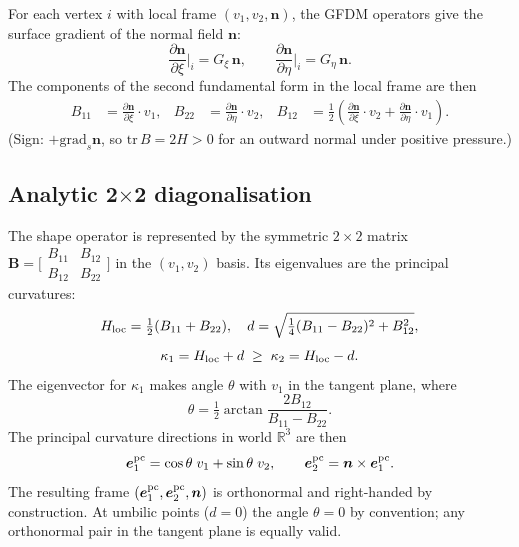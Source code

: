 \documentclass[11pt]{article}
\newcommand{\vv}[1]{\bm{#1}}          %
\newcommand{\nn}{\vv{n}}               %
\newcommand{\kone}{\kappa_1}
\newcommand{\ktwo}{\kappa_2}
\newcommand{\R}{\mathbb{R}}
\begin{document}
For each vertex $i$ with local frame $(v_1,v_2,\nn)$, the GFDM operators give
the surface gradient of the normal field $\nn$:
\begin{equation}
  \frac{\partial\nn}{\partial\xi}\Big|_i = G_\xi\,\nn, \qquad
  \frac{\partial\nn}{\partial\eta}\Big|_i = G_\eta\,\nn.
  \label{eq:grad-n}
\end{equation}
The components of the second fundamental form in the local frame are then
\begin{align}
  B_{11} &= \frac{\partial\nn}{\partial\xi}\cdot v_1, &
  B_{22} &= \frac{\partial\nn}{\partial\eta}\cdot v_2, &
  B_{12} &= \tfrac12\!\left(\frac{\partial\nn}{\partial\xi}\cdot v_2
                           + \frac{\partial\nn}{\partial\eta}\cdot v_1\right).
  \label{eq:B-components}
\end{align}
(Sign: $+\mathrm{grad}_s\nn$, so $\mathrm{tr}\,B=2H>0$ for an outward normal
under positive pressure.)

\subsection{Analytic 2$\times$2 diagonalisation}

The shape operator is represented by the symmetric $2\times 2$ matrix
$\mathbf{B}=\bigl[\begin{smallmatrix}B_{11}&B_{12}\\B_{12}&B_{22}\end{smallmatrix}\bigr]$
in the $(v_1,v_2)$ basis.  Its eigenvalues are the principal curvatures:
\begin{equation}
  H_{\rm loc} = \tfrac12(B_{11}+B_{22}), \quad
  d = \sqrt{\tfrac14(B_{11}-B_{22})^2 + B_{12}^2},
  \label{eq:eig-Hloc}
\end{equation}
\begin{equation}
  \kone = H_{\rm loc}+d \;\ge\; \ktwo = H_{\rm loc}-d.
  \label{eq:eig-kappas}
\end{equation}
The eigenvector for $\kone$ makes angle $\theta$ with $v_1$ in the tangent
plane, where
\begin{equation}
  \theta = \tfrac12\arctan\!\frac{2B_{12}}{B_{11}-B_{22}}.
  \label{eq:theta}
\end{equation}
The principal curvature directions in world $\R^3$ are then
\begin{equation}
  \vv{e}_1^{\rm pc} = \cos\theta\;v_1 + \sin\theta\;v_2, \qquad
  \vv{e}_2^{\rm pc} = \nn\times\vv{e}_1^{\rm pc}.
  \label{eq:pc-dirs}
\end{equation}
The resulting frame $(\vv{e}_1^{\rm pc},\vv{e}_2^{\rm pc},\nn)$ is orthonormal
and right-handed by construction.  At umbilic points ($d=0$) the angle
$\theta=0$ by convention; any orthonormal pair in the tangent plane is equally
valid.
\end{document}
